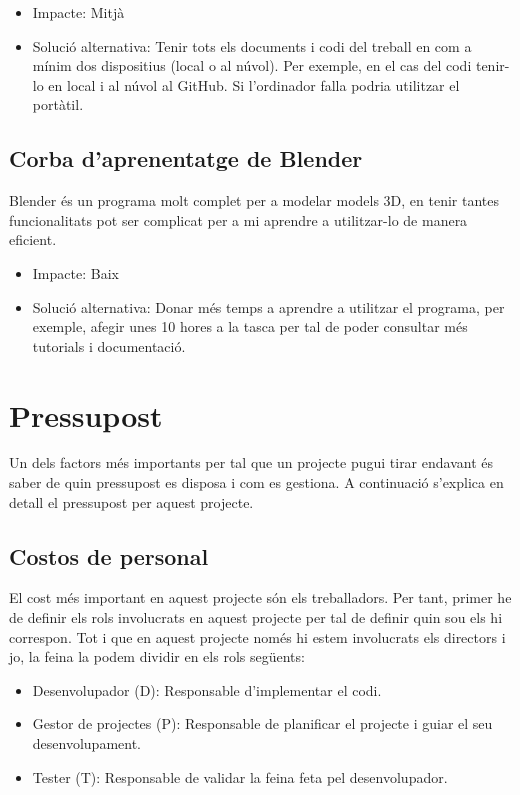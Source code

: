 \documentclass{article}
\begin{document}
\begin{itemize}
    \item Impacte: Mitjà
    \item Solució alternativa: Tenir tots els documents i codi del treball en com a mínim dos dispositius (local o al núvol). Per exemple, en el cas del codi tenir-lo en local i al núvol al GitHub. Si l'ordinador falla podria utilitzar el portàtil.
\end{itemize}

\subsection{Corba d'aprenentatge de Blender}

Blender és un programa molt complet per a modelar models 3D, en tenir tantes funcionalitats pot ser complicat per a mi aprendre a utilitzar-lo de manera eficient.

\begin{itemize}
    \item Impacte: Baix
    \item Solució alternativa: Donar més temps a aprendre a utilitzar el programa, per exemple, afegir unes 10 hores a la tasca per tal de poder consultar més tutorials i documentació.
\end{itemize}


\newpage

\section{Pressupost}

Un dels factors més importants per tal que un projecte pugui tirar endavant és saber de quin pressupost es disposa i com es gestiona. A continuació s'explica en detall el pressupost per aquest projecte.

\subsection{Costos de personal}

El cost més important en aquest projecte són els treballadors. Per tant, primer he de definir els rols involucrats en aquest projecte per tal de definir quin sou els hi correspon. Tot i que en aquest projecte només hi estem involucrats els directors i jo, la feina la podem dividir en els rols següents:

\begin{itemize}
    \item Desenvolupador (D): Responsable d'implementar el codi. 
    \item Gestor de projectes (P): Responsable de planificar el projecte i guiar el seu desenvolupament.
    \item Tester (T): Responsable de validar la feina feta pel desenvolupador.
\end{itemize}
\end{document}
